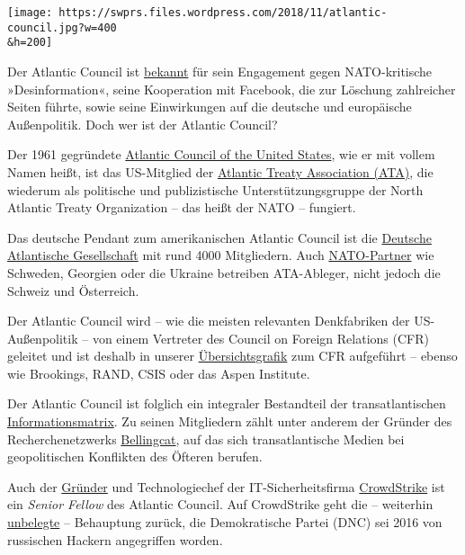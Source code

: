 \texttt{[image: https://swprs.files.wordpress.com/2018/11/atlantic-council.jpg?w=400\\\&h=200]}

Der Atlantic Council ist
\href{https://www.rubikon.news/artikel/facebook-als-waffe}{bekannt} für
sein Engagement gegen NATO-kritische »Desinformation«, seine Kooperation
mit Facebook, die zur Löschung zahlreicher Seiten führte, sowie seine
Einwirkungen auf die deutsche und europäische Außenpolitik. Doch wer ist
der Atlantic Council?

Der 1961 gegründete
\href{https://en.wikipedia.org/wiki/Atlantic_Council}{Atlantic Council
of the United States}, wie er mit vollem Namen heißt, ist das
US-Mitglied der
\href{https://en.wikipedia.org/wiki/Atlantic_Treaty_Association}{Atlantic
Treaty Association (ATA)}, die wiederum als politische und
publizistische Unter­stützungs­gruppe der North Atlantic Treaty
Organization -- das heißt der NATO -- fungiert.

Das deutsche Pendant zum amerikanischen Atlantic Council ist die
\href{https://de.wikipedia.org/wiki/Deutsche_Atlantische_Gesellschaft}{Deutsche
Atlantische Gesellschaft} mit rund 4000 Mitgliedern. Auch
\href{https://de.wikipedia.org/wiki/Partnerschaft_f\%C3\%BCr_den_Frieden}{NATO-Partner}
wie Schweden, Georgien oder die Ukraine betreiben ATA-Ableger, nicht
jedoch die Schweiz und Österreich.

Der Atlantic Council wird -- wie die meisten relevanten Denkfabriken der
US-Außenpolitik -- von einem Vertreter des Council on Foreign Relations
(CFR) geleitet und ist deshalb in unserer
\href{https://swprs.org/das-american-empire-und-seine-medien/}{Übersichtsgrafik}
zum CFR aufgeführt -- ebenso wie Brookings, RAND, CSIS oder das Aspen
Institute.

Der Atlantic Council ist folglich ein integraler Bestandteil der
transatlantischen
\href{https://swprs.org/die-propaganda-matrix/}{Informationsmatrix}. Zu
seinen Mitgliedern zählt unter anderem der Gründer des
Recherchenetzwerks
\href{https://de.wikipedia.org/wiki/Bellingcat}{Bellingcat}, auf das
sich transatlantische Medien bei geopolitischen Konflikten des Öfteren
berufen.

Auch der
\href{https://en.wikipedia.org/wiki/Dmitri_Alperovitch}{Gründer} und
Technologiechef der IT-Sicherheitsfirma
\href{https://en.wikipedia.org/wiki/CrowdStrike}{CrowdStrike} ist ein
\emph{Senior Fellow} des Atlan­tic Council. Auf CrowdStrike geht die --
weiterhin
\href{https://www.thenation.com/article/a-new-report-raises-big-questions-about-last-years-dnc-hack/}{unbelegte}
-- Behauptung zurück, die Demo­kra­tische Partei (DNC) sei 2016 von
russischen Hackern angegriffen worden.

